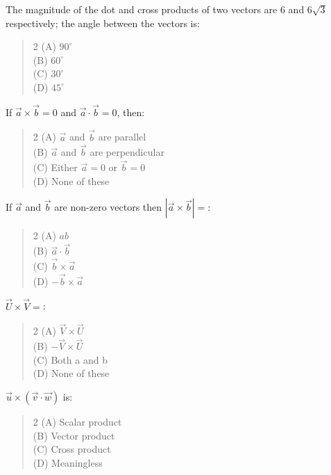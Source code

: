 \documentclass[11pt,a4paper]{article}
\begin{document}
\begin{mcqlist}
\item The magnitude of the dot and cross products of two vectors are $6$ and $6\sqrt{3}$ respectively; the angle between the vectors is:
\begin{quote}\begin{multicols}{2}
\noindent (A) $90^\circ$ \\
(B) $60^\circ$ \\
(C) $30^\circ$ \\
(D) $45^\circ$
\end{multicols}\end{quote}

\item If $\vec{a}\times\vec{b}=0$ and $\vec{a}\cdot\vec{b}=0$, then:
\begin{quote}\begin{multicols}{2}
\noindent (A) $\vec{a}$ and $\vec{b}$ are parallel \\
(B) $\vec{a}$ and $\vec{b}$ are perpendicular \\
(C) Either $\vec{a}=0$ or $\vec{b}=0$ \\
(D) None of these
\end{multicols}\end{quote}

\item If $\vec{a}$ and $\vec{b}$ are non-zero vectors then $|\vec{a}\times\vec{b}|=$:
\begin{quote}\begin{multicols}{2}
\noindent (A) $ab$ \\
(B) $\vec{a}\cdot\vec{b}$ \\
(C) $\vec{b}\times\vec{a}$ \\
(D) $-\vec{b}\times\vec{a}$
\end{multicols}\end{quote}

\item $\vec{U}\times\vec{V}=$:
\begin{quote}\begin{multicols}{2}
\noindent (A) $\vec{V}\times\vec{U}$ \\
(B) $-\vec{V}\times\vec{U}$ \\
(C) Both a and b \\
(D) None of these
\end{multicols}\end{quote}

\item $\vec{u}\times(\vec{v}\cdot\vec{w})$ is:
\begin{quote}\begin{multicols}{2}
\noindent (A) Scalar product \\
(B) Vector product \\
(C) Cross product \\
(D) Meaningless
\end{multicols}\end{quote}


\end{mcqlist}
\end{document}
